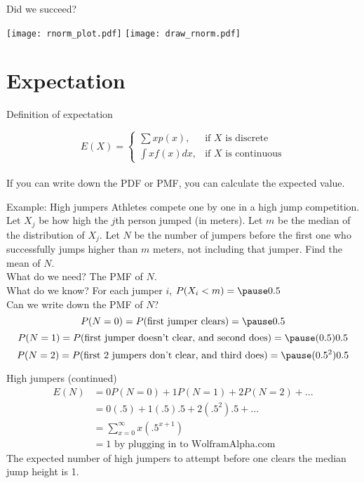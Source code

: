 \documentclass{beamer}
\begin{document}
\begin{frame}{Did we succeed?}
\begin{center}
\texttt{[image: rnorm\_plot.pdf]}
\texttt{[image: draw\_rnorm.pdf]}
\end{center}
\end{frame}

\section{Expectation}
\begin{frame}{Definition of expectation}

$$E(X)=\begin{cases} \sum xp(x),& \text{if }X\text{ is discrete} \\
\int xf(x)dx,&\text{if }X\text{ is continuous}\end{cases}$$
\\
\alert{If you can write down the PDF or PMF, you can calculate the expected value.}
\end{frame}

\begin{frame}{Example: High jumpers}
Athletes compete one by one in a high jump competition. Let $X_j$ be how high the $j$th person jumped (in meters). Let $m$ be the median of the distribution of $X_j$. Let $N$ be the number of jumpers before the first one who successfully jumps higher than $m$ meters, not including that jumper. Find the mean of $N$.\\
\alert{What do we need?} \pause The PMF of $N$. \pause \\
\alert{What do we know?} \pause For each jumper $i$, $P(X_i<m)=\pause 0.5$ \\ \pause
\alert{Can we write down the PMF of $N$?} \\
\pause
$$P(N=0) = P(\text{first jumper clears}) = \pause 0.5$$
$$P(N=1) = P(\text{first jumper doesn't clear, and second does}) = \pause (0.5)0.5$$
$$P(N=2) = P(\text{first 2 jumpers don't clear, and third does}) = \pause (0.5^2)0.5$$
\end{frame}

\begin{frame}{High jumpers (continued)}
\begin{align*}
E(N) &= 0P(N=0) + 1P(N=1) + 2P(N=2) +... \\
&= 0(.5) + 1(.5).5 + 2(.5^2).5 +... \\
&= \sum_{x=0}^\infty x\left (.5^{x+1}\right ) \\
&= 1 \text{ by plugging in to WolframAlpha.com}
\end{align*}
The expected number of high jumpers to attempt before one clears the median jump height is 1.
\end{frame}
\end{document}
